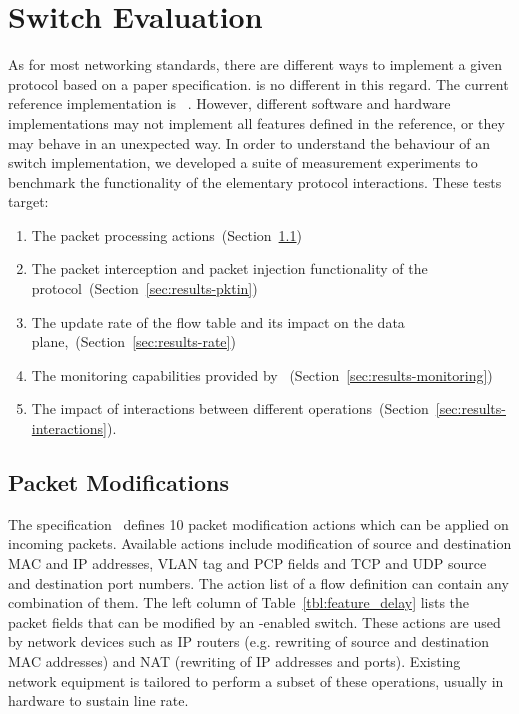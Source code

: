 \section{Switch Evaluation}\label{sec:oflops-result}

As for most networking standards, there are different ways to implement a given
protocol based on a paper specification. \of is no different in this regard. The
current \of reference implementation is \ovs~. However,
different software and hardware implementations may not implement all features
defined in the \ovs reference, or they may behave in an unexpected way. In order
to understand the behaviour of an \of switch implementation, we developed a suite of
measurement experiments to benchmark the functionality of the elementary
protocol interactions.  These tests target: 
\begin{enumerate}
  \item The \of packet processing actions~(Section~\ref{sec:results-packets})
  \item The packet interception and packet injection functionality of the
        protocol~(Section~\ref{sec:results-pktin})
  \item The update rate of the flow table and its impact on the data
        plane,~(Section~\ref{sec:results-rate})
  \item The monitoring capabilities provided by
        \of~(Section~\ref{sec:results-monitoring})
  \item The impact of interactions between different \of
        operations~(Section~\ref{sec:results-interactions}).  
\end{enumerate}


\subsection{Packet Modifications}\label{sec:results-packets}

The  specification~ defines 10 packet modification
actions which can be applied on incoming packets. Available actions include
modification of source and destination MAC and IP addresses, VLAN tag and PCP
fields and TCP and UDP source and destination port numbers. The action list
of a flow definition can contain any combination of them. The left column of
Table~\ref{tbl:feature_delay} lists the packet fields that can be modified by an
\of-enabled switch.  These actions are used by network devices such as IP
routers (e.g. rewriting of source and destination MAC addresses) and NAT
(rewriting of IP addresses and ports). Existing network equipment is tailored to
perform a subset of these operations, usually in hardware to sustain line rate.

